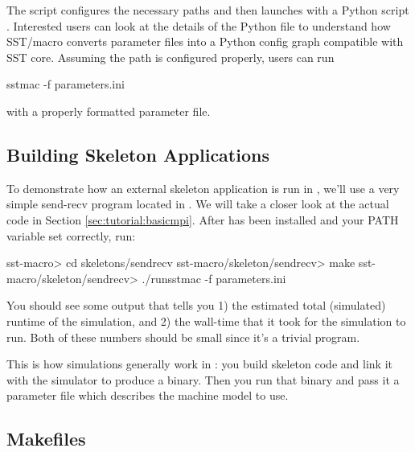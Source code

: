 
The script configures the necessary paths and then launches with a Python script .  Interested users can look at the details of the Python file to understand how SST/macro converts parameter files into a Python config graph compatible with SST core.
Assuming the path is configured properly, users can run

\begin{ShellCmd}
sstmac -f parameters.ini
\end{ShellCmd}
with a properly formatted parameter file.

\subsection{Building Skeleton Applications}
\label{sec:tutorial:runapp}

To demonstrate how an external skeleton application is run in \sstmacro, we'll use a very simple send-recv program located in .
We will take a closer look at the actual code in Section \ref{sec:tutorial:basicmpi}.
After \sstmacro has been installed and your PATH variable set correctly, run: 

\begin{ShellCmd}
sst-macro> cd skeletons/sendrecv
sst-macro/skeleton/sendrecv> make
sst-macro/skeleton/sendrecv> ./runsstmac -f parameters.ini
\end{ShellCmd}

You should see some output that tells you 1) the estimated total (simulated) runtime of the simulation, and 
2) the wall-time that it took for the simulation to run.  
Both of these numbers should be small since it's a trivial program. 

This is how simulations generally work in \sstmacro: you build skeleton code and link it with the simulator to produce a binary.  
Then you run that binary and pass it a parameter file which describes the machine model to use.

\subsection{Makefiles}
\label{subsec:tutorial:makefiles}

